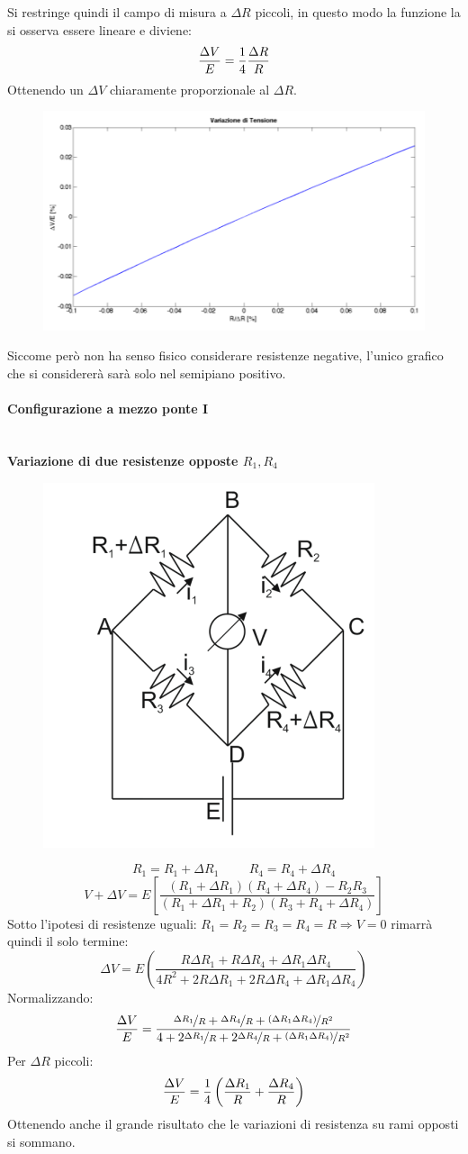 \documentclass[a4paper, 15pt]{article}
\begin{document}
\begin{adjustwidth}{2in}{}
		Si restringe quindi il campo di misura a $\Delta R$ piccoli, in questo modo la funzione la si osserva essere lineare e diviene: 
		\[\dfrac{\Delta V}{E} = {1\over4}\dfrac{\Delta R}{R}\]
		Ottenendo un $\Delta V$ chiaramente proporzionale al $\Delta R$.		
		\begin{figure}[H]
			\centering
			\includegraphics[width=0.5\linewidth]{fig/screenshot015}
			\label{fig:screenshot015}
		\end{figure}				
		Siccome però non ha senso fisico considerare resistenze negative, l'unico grafico che si considererà sarà solo nel semipiano positivo.  

\paragraph{Configurazione a mezzo ponte I} \mbox{} \\				
		\textbf{Variazione di due resistenze opposte $R_1, R_4$}		
		\begin{figure}[H]
			\centering
			\includegraphics[width=0.3\linewidth]{fig/screenshot016}
			\label{fig:screenshot016}
		\end{figure}				
		\[R_1 = R_1 + \Delta R_1 \hspace{1cm} R_4 = R_4 + \Delta R_4 \]
		\[V+\Delta V = E\left[\dfrac{(R_1+ \Delta R_1)(R_4 + \Delta R_4)-R_2R_3}{(R_1+ \Delta R_1+R_2)(R_3+R_4 + \Delta R_4)}\right]\]
		Sotto l'ipotesi di resistenze uguali: $R_1=R_2=R_3=R_4=R\Rightarrow V=0$ rimarrà quindi il solo termine:
		\[\Delta V = E\left(\dfrac{R\Delta R_1 + R\Delta R_4 + \Delta R_1\Delta R_4 }{4R^2 + 2R\Delta R_1+2R\Delta R_4 + \Delta R_1\Delta R_4}\right)\]
		Normalizzando: 
		\[\dfrac{\Delta V}{E} = \dfrac{\nicefrac{\Delta R_1}{R} + \nicefrac{\Delta R_4}{R} + \nicefrac{(\Delta R_1\Delta R_4)}{R^2}}{4+2\nicefrac{\Delta R_1}{R} + 2\nicefrac{\Delta R_4}{R} + \nicefrac{(\Delta R_1\Delta R_4)}{R^2}}\]
		Per $\Delta R$ piccoli:
		\[\dfrac{\Delta V}{E} = {1\over4}\left(\dfrac{\Delta R_1}{R} + \dfrac{\Delta R_4}{R}\right)\]
		Ottenendo anche il grande risultato che le variazioni di resistenza su rami opposti si sommano. 
		

\end{adjustwidth}
\end{document}
